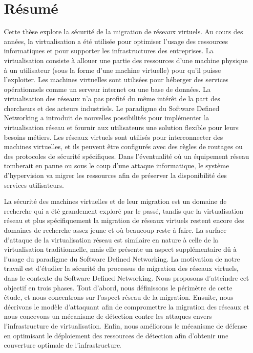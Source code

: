 \documentclass[a4paper, 11pt]{report}
\theoremstyle{definition}
\begin{document}
\chapter*{R\'esum\'e}
Cette th\`{e}se explore la s\'{e}curit\'{e} de la migration de r\'{e}seaux virtuels. Au cours des ann\'{e}es, la virtualisation a \'{e}t\'{e} utilis\'{e}e pour optimiser l'usage des ressources informatiques et pour supporter les infrastructures des entreprises. La virtualisation consiste \`{a} allouer une partie des ressources d'une machine physique \`{a} un utilisateur (sous la forme d'une machine virtuelle) pour qu'il puisse l'exploiter. Les machines virtuelles sont utilis\'{e}es pour h\'{e}berger des services op\'{e}rationnels comme un serveur internet ou une base de donn\'{e}es. La virtualisation des r\'{e}seaux n'a pas profit\'{e} du m\^{e}me int\'{e}r\^{e}t de la part des chercheurs et des acteurs industriels. Le paradigme du Software Defined Networking a introduit de nouvelles possibilit\'{e}s pour impl\'{e}menter la virtualisation r\'{e}seau et fournir aux utilisateurs une solution flexible pour leurs besoins m\'{e}tiers. Les r\'{e}seaux virtuels sont utilis\'{e}s pour interconnecter des machines virtuelles, et ils peuvent \^{e}tre configur\'{e}s avec des r\`{e}gles de routages ou des protocoles de s\'{e}curit\'{e} sp\'{e}cifiques. Dans l'\'{e}ventualit\'{e} o\`{u} un \'{e}quipement r\'{e}seau tomberait en panne ou sous le coup d'une attaque informatique, le syst\`{e}me d'hypervision va migrer les ressources afin de pr\'{e}server la disponibilit\'{e} des services utilisateurs.

La s\'{e}curit\'{e} des machines virtuelles et de leur migration est un domaine de recherche qui a \'{e}t\'{e} grandement explor\'{e} par le pass\'{e}, tandis que la virtualisation r\'{e}seau et plus sp\'{e}cifiquement la migration de r\'{e}seaux virtuels restent encore des domaines de recherche assez jeune et o\`{u} beaucoup reste \`{a} faire. La surface d'attaque de la virtualisation r\'{e}seau est similaire en nature \`{a} celle de la virtualisation traditionnelle, mais elle pr\'{e}sente un aspect suppl\'{e}mentaire d\^{u} \`{a} l'usage du paradigme du Software Defined Networking. La motivation de notre travail est d'\'{e}tudier la s\'{e}curit\'{e} du processus de migration des r\'{e}seaux virtuels, dans le contexte du Software Defined Networking. Nous proposons d'atteindre cet objectif en trois phases. Tout d'abord, nous d\'{e}finissons le p\'{e}rim\`{e}tre de cette \'{e}tude, et nous concentrons sur l'aspect r\'{e}seau de la migration. Ensuite, nous d\'{e}crivons le mod\`{e}le d'attaquant afin de compromettre la migration des r\'{e}seaux et nous concevons un m\'{e}canisme de d\'{e}tection contre les attaques envers l'infrastructure de virtualisation. Enfin, nous am\'{e}liorons le m\'{e}canisme de d\'{e}fense en optimisant le d\'{e}ploiement des ressources de d\'{e}tection afin d'obtenir une couverture optimale de l'infrastructure. 
\end{document}
